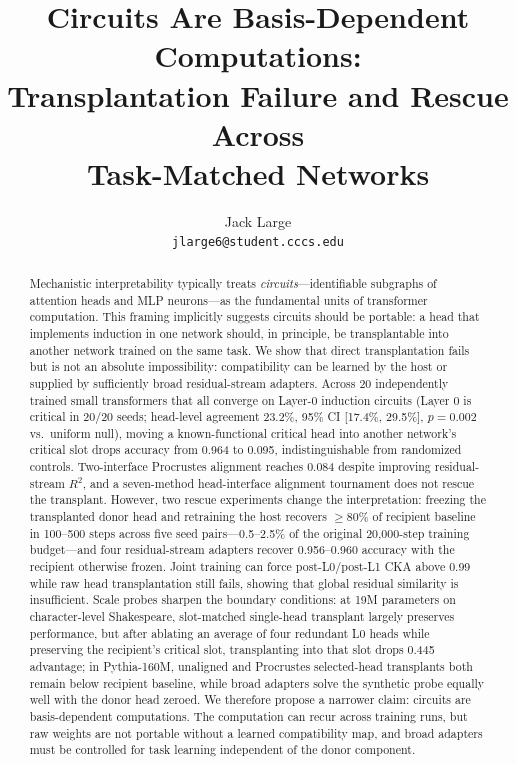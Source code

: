 \documentclass[final]{article}
\title{Circuits Are Basis-Dependent Computations:\\
Transplantation Failure and Rescue Across\\
Task-Matched Networks}
\author{%
  Jack Large\\
  \texttt{jlarge6@student.cccs.edu}
}
\begin{document}
\maketitle

\begin{abstract}
Mechanistic interpretability typically treats \emph{circuits}---identifiable
subgraphs of attention heads and MLP neurons---as the fundamental units of
transformer computation. This framing implicitly suggests circuits should be
portable: a head that implements induction in one network should, in principle,
be transplantable into another network trained on the same task. We
show that direct transplantation fails but is not an absolute impossibility:
compatibility can be learned by the host or supplied by sufficiently broad
residual-stream adapters. Across 20 independently trained small transformers
that all converge on Layer-0 induction circuits (Layer 0 is critical in 20/20
seeds; head-level agreement 23.2\%, 95\% CI [17.4\%, 29.5\%], $p=0.002$ vs.\
uniform null), moving a known-functional critical head into another network's
critical slot drops accuracy from 0.964 to 0.095, indistinguishable from
randomized controls. Two-interface Procrustes alignment reaches 0.084 despite
improving residual-stream $R^2$, and a seven-method head-interface alignment
tournament does not rescue the transplant. However, two rescue experiments
change the interpretation: freezing the transplanted donor head and retraining
the host recovers $\geq 80\%$ of recipient baseline in 100--500 steps across
five seed pairs---0.5--2.5\% of the original 20,000-step training
budget---and four residual-stream adapters recover 0.956--0.960 accuracy with
the recipient otherwise frozen. Joint training can force
post-L0/post-L1 CKA above 0.99 while raw head transplantation still fails,
showing that global residual similarity is insufficient. Scale probes sharpen
the boundary conditions: at 19M parameters on character-level Shakespeare,
slot-matched single-head transplant largely preserves performance, but after
ablating an average of four redundant L0 heads while preserving the recipient's
critical slot, transplanting into that slot drops 0.445 advantage; in
Pythia-160M, unaligned and Procrustes selected-head transplants both remain
below recipient baseline, while broad adapters solve the synthetic probe
equally well with the donor head zeroed. We therefore propose a narrower claim:
circuits are basis-dependent computations. The computation can recur across
training runs, but raw weights are not portable without a learned compatibility
map, and broad adapters must be controlled for task learning independent of the
donor component.
\end{abstract}
\end{document}
